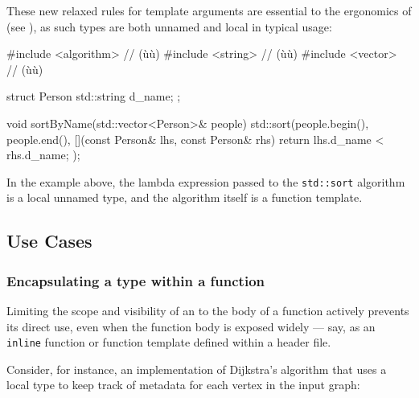 These new relaxed rules for template arguments are essential to the
ergonomics of  (see ), as such types are both
unnamed and local in typical usage:

\begin{emcppslisting}
#include <algorithm>  // (ù{}ù)
#include <string>     // (ù{}ù)
#include <vector>     // (ù{}ù)

struct Person { std::string d_name; };

void sortByName(std::vector<Person>& people)
{
    std::sort(people.begin(), people.end(),
              [](const Person& lhs, const Person& rhs)
              {
                  return lhs.d_name < rhs.d_name;
              });
}
\end{emcppslisting}

\noindent In the example above, the lambda expression passed to the
\lstinline!std::sort! algorithm is a local unnamed type, and the algorithm
itself is a function template.

\subsection[Use Cases]{Use Cases}\label{use-cases}

\subsubsection[Encapsulating a type within a function]{Encapsulating a type within a function}\label{encapsulating-a-type-within-a-function}

Limiting the scope and visibility of an  to the body of a
function actively prevents its direct use, even when the function body
is exposed widely --- say, as an \lstinline!inline! function or function
template defined within a header file.

Consider, for instance, an implementation of Dijkstra's algorithm that
uses a local type to keep track of metadata for each vertex in the input
graph:


